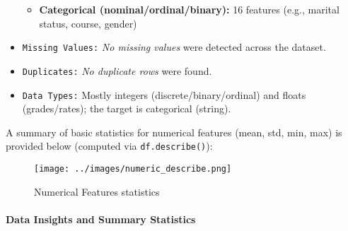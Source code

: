 \documentclass[twoside,final]{hcmut-report}
\begin{document}
\begin{itemize}[parsep=0pt, itemsep=0pt, topsep=0pt]
\begin{itemize}
          \item \textbf{Categorical (nominal/ordinal/binary):} 16 features (e.g., marital status, course, gender)
        \end{itemize}
  \item \texttt{Missing Values:} \textit{No missing values} were detected across the dataset.
  \item \texttt{Duplicates:} \textit{No duplicate rows} were found.
  \item \texttt{Data Types:} Mostly integers (discrete/binary/ordinal) and floats (grades/rates); the target is categorical (string).
\end{itemize}

A summary of basic statistics for numerical features (mean, std, min, max) is provided below (computed via \texttt{df.describe()}):

\begin{figure}[H]
  \centering
  \texttt{[image: ../images/numeric\_describe.png]}
  \caption{Numerical Features statistics}
  \label{num-describe}
\end{figure}


\paragraph{Data Insights and Summary Statistics}
\end{document}
